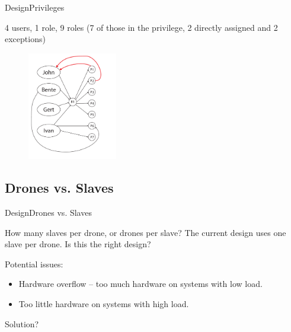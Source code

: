 \begin{frame}{Design}{Privileges}
  \begin{block}{}
  	4 users, 1 role, 9 roles (7 of those in the privilege, 2 directly assigned and 2 exceptions)

  	\begin{figure}[htb]
    	\centering
    	\includegraphics[width=0.35\textwidth]{images/privileges5.pdf}
  	\end{figure}
  \end{block}
\end{frame}



\subsection{Drones vs. Slaves}
\begin{frame}{Design}{Drones vs. Slaves}
  \begin{block}{How many slaves per drone, or drones per slave?}
	The current design uses one slave per drone. Is this the right design?

	Potential issues:
	\begin{itemize}
		\item Hardware overflow -- too much hardware on systems with low load.
		\item Too little hardware on systems with high load.
	\end{itemize}

	Solution?
  \end{block}
\end{frame}



